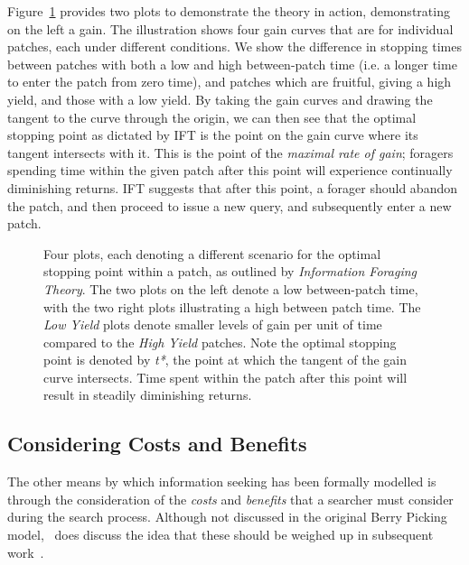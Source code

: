 Figure~\ref{fig:ch3-ift} provides two plots to demonstrate the theory in action, demonstrating on the left a gain. The illustration shows four gain curves that are for individual patches, each under different conditions. We show the difference in stopping times between patches with both a low and high between-patch time (i.e. a longer time to enter the patch from zero time), and patches which are fruitful, giving a high yield, and those with a low yield. By taking the gain curves and drawing the tangent to the curve through the origin, we can then see that the optimal stopping point as dictated by IFT is the point on the gain curve where its tangent intersects with it. This is the point of the \emph{maximal rate of gain}; foragers spending time within the given patch after this point will experience continually diminishing returns. IFT suggests that after this point, a forager should abandon the patch, and then proceed to issue a new query, and subsequently enter a new patch.

\begin{figure}[t!]
    \centering
    \caption[Plots of optimal patch stopping points for Information Foraging Theory]{Four plots, each denoting a different scenario for the optimal stopping point within a patch, as outlined by \emph{Information Foraging Theory}. The two plots on the left denote a low between-patch time, with the two right plots illustrating a high between patch time. The \emph{Low Yield} plots denote smaller levels of gain per unit of time compared to the \emph{High Yield} patches. Note the optimal stopping point is denoted by \emph{t*}, the point at which the tangent of the gain curve intersects. Time spent within the patch after this point will result in steadily diminishing returns.}
    \label{fig:ch3-ift}
\end{figure}

\vspace{-5mm}
\subsection{Considering Costs and Benefits}
The other means by which information seeking has been formally modelled is through the consideration of the \emph{costs} and \emph{benefits} that a searcher must consider during the search process. Although not discussed in the original Berry Picking model,~\citeauthor{bates1979search_tactics} does discuss the idea that these should be weighed up in subsequent work~\citep{bates1979search_tactics}.

